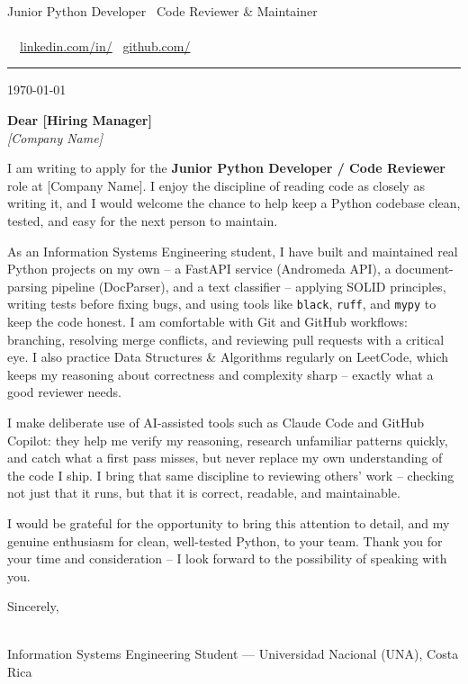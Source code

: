 \documentclass[11pt]{article}
\begin{document}
{\color{cvprimary}\Huge\bfseries \MyName}\\[2pt]
{\color{cvaccent}\large Junior Python Developer \textbullet\ Code Reviewer \& Maintainer}\\[6pt]
{\small\color{cvlight}%
  \faMapMarker* \, \MyLocation \quad\textbullet\quad
  \faPhone* \, \MyPhone \\[2pt]
  \faEnvelope \, \href{mailto:\MyEmail}{\MyEmail} \quad\textbullet\quad
  \faLinkedin \, \href{\MyLinkedInURL}{linkedin.com/in/\MyLinkedIn} \quad\textbullet\quad
  \faGithub \, \href{\MyGitHubURL}{github.com/\MyGitHub}%
}\\[-2pt]
{\color{cvaccent}\rule{\linewidth}{1.2pt}}

\vspace{10pt}
{\color{cvlight}\small \today}

\vspace{8pt}
{\color{cvprimary}\bfseries Dear [Hiring Manager]}\\
{\itshape [Company Name]}

\vspace{12pt}
I am writing to apply for the \textbf{Junior Python Developer / Code Reviewer} role at
[Company Name]. I enjoy the discipline of reading code as closely as writing it, and I would
welcome the chance to help keep a Python codebase clean, tested, and easy for the next
person to maintain.

As an Information Systems Engineering student, I have built and maintained real Python
projects on my own -- a FastAPI service (Andromeda API), a document-parsing pipeline
(DocParser), and a text classifier -- applying SOLID principles, writing tests before fixing
bugs, and using tools like \texttt{black}, \texttt{ruff}, and \texttt{mypy} to keep the code
honest. I am comfortable with Git and GitHub workflows: branching, resolving merge conflicts,
and reviewing pull requests with a critical eye. I also practice Data Structures \&
Algorithms regularly on LeetCode, which keeps my reasoning about correctness and complexity
sharp -- exactly what a good reviewer needs.

I make deliberate use of AI-assisted tools such as Claude Code and GitHub Copilot: they help
me verify my reasoning, research unfamiliar patterns quickly, and catch what a first pass
misses, but never replace my own understanding of the code I ship. I bring that same
discipline to reviewing others' work -- checking not just that it runs, but that it is
correct, readable, and maintainable.

I would be grateful for the opportunity to bring this attention to detail, and my genuine
enthusiasm for clean, well-tested Python, to your team. Thank you for your time and
consideration -- I look forward to the possibility of speaking with you.

\vspace{8pt}
Sincerely,

\vspace{16pt}
{\color{cvprimary}\bfseries \MyName}\\
{\color{cvlight}\small Information Systems Engineering Student --- Universidad Nacional (UNA), Costa Rica}
\end{document}
